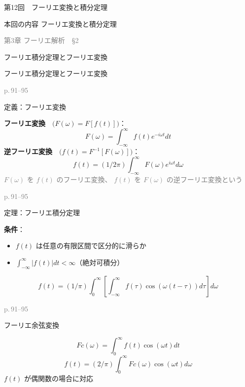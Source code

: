 \documentclass[aspectratio=43,professionalfonts,handout]{beamer}
\begin{document}
\begin{frame}{第12回　フーリエ変換と積分定理}
  \begin{block}{本回の内容}
  フーリエ変換と積分定理
  \end{block}
  \vfill\hfill{\scriptsize \textcolor{gray}{第3章 フーリエ解析　§2}}
\end{frame}

\begin{frame}{フーリエ積分定理とフーリエ変換}
  \begin{block}{}
  {\large フーリエ積分定理とフーリエ変換}
  \end{block}
  \vfill\hfill{\scriptsize \textcolor{gray}{p.\,91--95}}
\end{frame}

\begin{frame}{定義：フーリエ変換}
  \begin{block}{}
  \medskip\textbf{フーリエ変換}　$\bigl(F(\omega) = F[f(t)]\bigr)$：
  \[
    F(\omega) = \int_{-\infty}^{\infty} f(t) e^{-i\omega t} dt
  \]
  \medskip\textbf{逆フーリエ変換}　$\bigl(f(t) = F^{-1}[F(\omega)]\bigr)$：
  \[
    f(t) = (1/2\pi) \int_{-\infty}^{\infty} F(\omega) e^{i\omega t} d\omega
  \]
  {\footnotesize \textcolor{gray}{$F(\omega)$ を $f(t)$ のフーリエ変換、 $f(t)$ を $F(\omega)$ の逆フーリエ変換という}}
  \end{block}
  \vfill\hfill{\scriptsize \textcolor{gray}{p.\,91--95}}
\end{frame}

\begin{frame}{定理：フーリエ積分定理}
  \begin{block}{}
  \textbf{条件}：
  \begin{itemize}
    \item $f(t)$ は任意の有限区間で区分的に滑らか
    \item $\int_{-\infty}^{\infty} |f(t)| dt < \infty$（絶対可積分）
  \end{itemize}
  \[
    f(t) = (1/\pi) \int_{0}^\infty [\int_{-\infty}^{\infty} f(\tau)\cos(\omega(t-\tau)) d\tau] d\omega
  \]
  \end{block}
  \vfill\hfill{\scriptsize \textcolor{gray}{p.\,91--95}}
\end{frame}

\begin{frame}{フーリエ余弦変換}
  \begin{block}{}
  \[
    Fc(\omega) = \int_{0}^\infty f(t)\cos(\omega t) dt
  \]
  \[
    f(t) = (2/\pi) \int_{0}^\infty Fc(\omega)\cos(\omega t) d\omega
  \]
  {\footnotesize $f(t)$ が偶関数の場合に対応}
  \end{block}
\end{frame}
\end{document}
